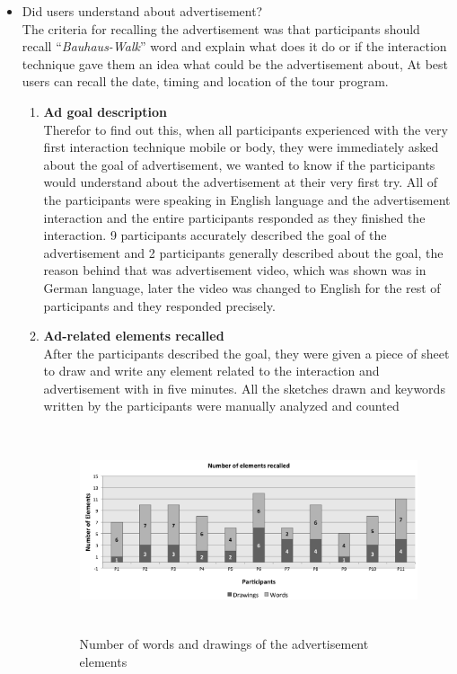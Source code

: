 \begin{itemize}


\item Did users understand about advertisement? \\

	The criteria for recalling the advertisement was that participants should recall ``\emph{Bauhaus-Walk}'' word and explain what does it do or if the interaction technique gave them an idea what could be the advertisement about, At best users can recall the date, timing and location of the tour program.

\begin{enumerate}

\item	\textbf{Ad goal description} \\
Therefor to find out this, when all participants experienced with the very first interaction technique mobile or body, they were immediately asked about the goal of advertisement, we wanted to know if the participants would understand about the advertisement at their very first try. All of the participants were speaking in English language and the advertisement interaction and the entire participants responded as they finished the interaction. 9 participants accurately described the goal of the advertisement and 2 participants generally described about the goal, the reason behind that was advertisement video, which was shown was in German language, later the video was changed to English for the rest of participants and they responded precisely.

\item	\textbf{Ad-related elements recalled}  \\ 
After the participants described the goal, they were given a piece of sheet to draw and write any element related to the interaction and advertisement with in five minutes. All the sketches drawn and keywords written by the participants were manually analyzed and counted

\begin{figure}[H]
\centering
\includegraphics[width=12cm,height=6cm]{Figures/6/word_recall}%
 \caption{Number of words and drawings of the advertisement elements }%
 \label{fig:word_recall}%
\end{figure}


\end{enumerate}
\end{itemize}

